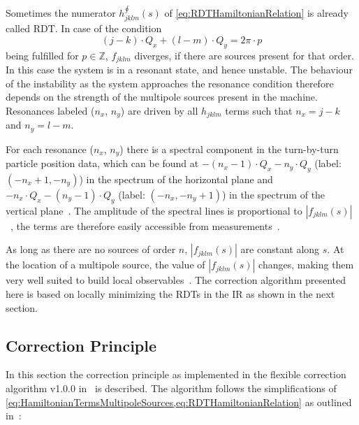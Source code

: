 %
Sometimes the numerator $h^{\oint}_{jklm}(s)$ of \cref{eq:RDTHamiltonianRelation} is already called RDT.
In case of the condition 
%
\begin{equation}
    \label{eq:ResonanceCondition}
    (j-k) \cdot Q_x + (l-m) \cdot Q_y = 2\pi \cdot p 
\end{equation}
%
being fulfilled for $p \in \mathbb{Z}$, $f_{jklm}$ diverges, if there are sources present for that order.
In this case the system is in a resonant state, and hence unstable.
The behaviour of the instability as the system approaches the resonance condition therefore depends 
on the strength of the multipole sources present in the machine.
Resonances labeled ($n_x$, $n_y$) are driven by all $h_{jklm}$ terms such that $n_x = j-k$ and $n_y = l - m$.

For each resonance ($n_x$, $n_y$) there is a  spectral component in the turn-by-turn particle position data,
which can be found at $-(n_x-1) \cdot Q_x - n_y \cdot Q_y$ (label: $(-n_x+1, -n_y)$) in the spectrum of the horizontal plane 
and $-n_x \cdot Q_x - (n_y - 1) \cdot Q_y$ (label: $(-n_x, -n_y+1)$) in the spectrum of the vertical plane~\cite{FranchiStudiesMeasurementsLinear2006}.
The amplitude of the spectral lines is proportional to $\left| f_{jklm} (s) \right|$~\cite{FranchiStudiesMeasurementsLinear2006},
the terms are therefore easily accessible from measurements~\cite{SchmidtMeasurementDrivingTerms2001,TomasDirectMeasurementResonance2003,TomasMeasurementGlobalLocal2005,FranchiFirstSimultaneousMeasurement2014,CarlierObservationsResonanceDriving2016}.

As long as there are no sources of order $n$, $|f_{jklm}(s)|$ are constant along $s$.
At the location of a multipole source, the value of $|f_{jklm}(s)|$ changes, 
making them very well suited to build local observables~\cite{TomasMeasurementGlobalLocal2005}.
The correction algorithm presented here is based on locally minimizing the RDTs in the IR as shown in the next section. 

\subsection{Correction Principle}
\label{sec:CorrectionPrinciple}
 
In this section the correction principle as implemented in
the flexible correction algorithm v1.0.0 in~\cite{OMC-TeamIRNLRDTCorrection} is described.
The algorithm follows the simplifications of \cref{eq:HamiltonianTermsMultipoleSources,eq:RDTHamiltonianRelation} 
as outlined in~\cite{BruningDynamicApertureStudies2004}:

